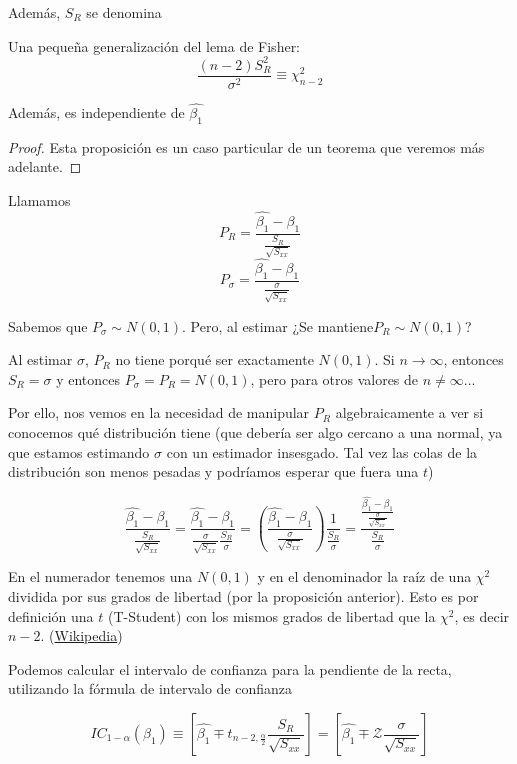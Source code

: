 Además, $S_R$ se denomina 

\begin{prop}
Una pequeña generalización del lema de Fisher:
\[
\frac{(n-2)S_{R}^2}{σ^2} \equiv \chi_{n-2}^2
\]

Además, es independiente de $\hat{β_1}$

\end{prop}



\begin{proof}
Esta proposición es un caso particular de un teorema que veremos más adelante.
\end{proof}


Llamamos
\[ P_{R} = \frac{\hat{β_1}-β_1}{\frac{S_R}{\sqrt{S_{xx}}}}\]
\[ P_σ = \frac{\hat{β_1}-β_1}{\frac{σ}{\sqrt{S_{xx}}}}\]

Sabemos que $P_σ \sim N(0,1)$. Pero, al estimar ¿Se mantiene$P_R \sim N(0,1)$?

Al estimar $σ$,  $P_{R}$ no tiene porqué ser exactamente $N(0,1)$. Si $n\to ∞$, entonces $S_R = σ$ y entonces $P_σ = P_R = N(0,1)$, pero para otros valores de $n≠∞$...

Por ello, nos vemos en la necesidad de manipular $P_R$ algebraicamente a ver si conocemos qué distribución tiene (que debería ser algo cercano a una normal, ya que estamos estimando $σ$ con un estimador insesgado. Tal vez las colas de la distribución son menos pesadas y podríamos esperar que fuera una $t$)

\label{Cuentas:largas}

\[
\displaystyle\frac{\hat{β_1}-β_1}{\displaystyle\frac{S_R}{\sqrt{S_{xx}}}} = \displaystyle\frac{\hat{β_1}-β_1}{\displaystyle\frac{σ}{\sqrt{S_{xx}}}\frac{S_R}{σ}} = \left( \displaystyle\frac{\hat{β_1}-β_1}{\displaystyle\frac{σ}{\sqrt{S_{xx}}}} \right)\displaystyle\frac{1}{\displaystyle\frac{S_R}{σ}} = \displaystyle\frac{ \displaystyle\frac{\hat{β_1}-β_1}{\frac{σ}{\sqrt{S_{xx}}}} }{\displaystyle\frac{S_R}{σ}}
\]

En el numerador tenemos una $N(0,1)$ y en el denominador la raíz de una $\chi^2$ dividida por sus grados de libertad (por la proposición anterior). Esto es por definición una $t$ (T-Student) con los mismos grados de libertad que la $\chi^2$, es decir $n-2$. (\href{https://en.wikipedia.org/wiki/Student%27s\_t-distribution#Characterization}{Wikipedia})


\begin{prop}
Podemos calcular el intervalo de confianza  para la pendiente de la recta, utilizando la fórmula de intervalo de confianza

\[
IC_{1-α}(β_1) \equiv \left[ \hat{β_1} \mp t_{n-2,\frac{α}{2}}\frac{S_R}{\sqrt{S_{xx}}}\right] = \left[ \hat{β_1} \mp \mathcal{Z}\frac{σ}{\sqrt{S_{xx}}}\right] %
\]
\end{prop}


